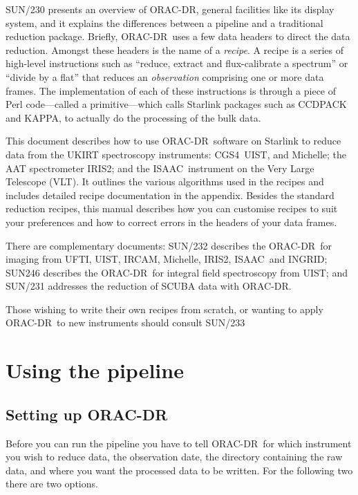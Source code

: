 \documentclass[twoside,11pt]{article}
\newcommand{\htmladdnormallink}[2]{#1}
\newcommand{\xref}[3]{#1}
\newcommand{\xlabel}[1]{}
\renewcommand{\_}{\texttt{\symbol{95}}}
\newcommand{\CCDPACK}{{\footnotesize CCDPACK}}
\newcommand{\KAPPA}{{\footnotesize KAPPA}}
\newcommand{\ORACDR}{{\footnotesize ORAC-DR}}
\newcommand{\VLT}{\htmladdnormallink{VLT}{http://www.eso.org/instruments/}}
\newcommand{\INGRID}{\htmladdnormallink{INGRID}{http://www.ing.iac.es/Astronomy/instruments/ingrid/}}
\newcommand{\IRCAM}{\htmladdnormallink{IRCAM}{http://www.jach.hawaii.edu/JACpublic/UKIRT/instruments/ircam/ircam3.html}}
\newcommand{\IRIS}{\htmladdnormallink{IRIS2}{http://www.aao.gov.au/iris2/}}
\newcommand{\ISAAC}{\htmladdnormallink{ISAAC}{http://www.eso.org/instruments/isaac/}}
\newcommand{\Michelle}{\htmladdnormallink{Michelle}{http://www.jach.hawaii.edu/JACpublic/UKIRT/instruments/michelle/michelle.html}}
\newcommand{\UIST}{\htmladdnormallink{UIST}{http://www.jach.hawaii.edu/JACpublic/UKIRT/instruments/uist/uist.html}}
\newcommand{\UFTI}{\htmladdnormallink{UFTI}{http://www.jach.hawaii.edu/JACpublic/UKIRT/instruments/ufti/ufti.html}}
\newcommand{\CGS}{\htmladdnormallink{CGS4}{http://www.jach.hawaii.edu/JACpublic/UKIRT/instruments/cgs4/cgs4.html}}
\begin{document}
\xref{SUN/230}{sun230}{} presents an overview of \ORACDR, general
facilities like its display system, and it explains the differences
between a pipeline and a traditional reduction package. Briefly,
\ORACDR\ uses a few data headers to direct the data reduction.
Amongst these headers is the name of a {\em recipe}. A recipe is
a series of high-level instructions such as ``reduce, extract and
flux-calibrate a spectrum'' or ``divide by a flat'' that reduces
an {\em observation\/} comprising one or more data frames. The
implementation of each of these instructions is through a piece
of Perl code---called a primitive---which calls Starlink packages such as
\xref{\CCDPACK}{sun139}{} and \xref{\KAPPA}{sun95}{}, to actually
do the processing of the bulk data.

This document describes how to use \ORACDR\ software on Starlink
to reduce data from the UKIRT spectroscopy instruments: \CGS\,
\UIST, and \Michelle; the AAT spectrometer \IRIS; and the
\ISAAC\ instrument on the Very Large Telescope (\VLT). It outlines
the various algorithms used in the recipes and includes detailed
recipe documentation in the appendix. Besides the standard reduction
recipes, this manual describes how you can customise recipes to
suit your preferences and how to correct errors in the headers
of your data frames.

There are complementary documents: \xref{SUN/232}{sun232}{} describes
the \ORACDR\ for imaging from \UFTI, \UIST, \IRCAM, \Michelle, \IRIS,
\ISAAC\ and \INGRID; \xref{SUN246}{sun246}{} describes the \ORACDR\
for integral field spectroscopy from \UIST; and \xref{SUN/231}{sun231}{}
addresses the reduction of SCUBA data with \ORACDR.

Those wishing to write their own recipes from scratch, or wanting to
apply \ORACDR\ to new instruments should consult \xref{SUN/233}{sun233}{}

\section{\xlabel{using_the_pipeline}Using the pipeline\label{using_the_pipeline}}

\subsection{\xlabel{setting_up_orac-dr}Setting up \ORACDR\label{setting_up_orac-dr}}

Before you can run the pipeline you have to tell \ORACDR\ for which
instrument you wish to reduce data, the observation date, the directory
containing the raw data, and where you want the processed data to be
written. For the following two there are two options.
\end{document}
